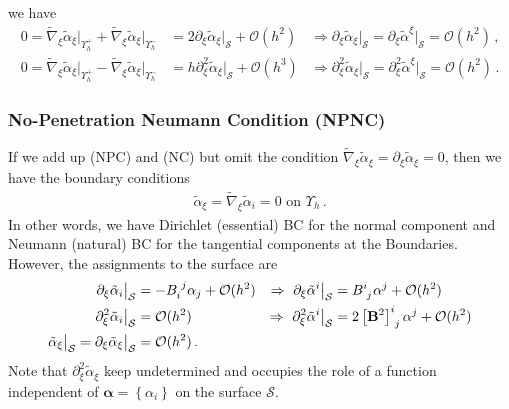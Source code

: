 \documentclass[a4paper,10pt]{scrartcl}
\newcommand{\surf}{\mathcal{S}}
\newcommand{\landau}{\mathcal{O}}
\newcommand{\Bb}{\mathbf{B}}
\newcommand{\alphab}{\bm{\alpha}}
\newcommand{\talpha}{\tilde{\alpha}}
\newcommand{\tnabla}{\tilde{\nabla}}
\newcommand{\boundary}[1]{\Upsilon_{h}^{#1}}
\newcommand{\AtBoundary}[1]{\big|_{\boundary{#1}}}
\newcommand{\AtSurface}{\big|_{\surf}}
\newcommand{\formComma}{\,\text{,}}
\newcommand{\formPeriod}{\,\text{.}}
\begin{document}
    we have
    \begin{align}
      0 = \tnabla_{\xi}\talpha_{\xi}\AtBoundary{+} + \tnabla_{\xi}\talpha_{\xi}\AtBoundary{-}
        &= 2\partial_{\xi}\talpha_{\xi}\AtSurface + \landau(h^{2})
            &\Rightarrow \boxed{\partial_{\xi}\talpha_{\xi}\AtSurface = \partial_{\xi}\talpha^{\xi}\AtSurface = \landau(h^{2})} \formComma\\
      0 = \tnabla_{\xi}\talpha_{\xi}\AtBoundary{+} - \tnabla_{\xi}\talpha_{\xi}\AtBoundary{-}
        &= h\partial_{\xi}^{2}\talpha_{\xi}\AtSurface + \landau(h^{3})
            &\Rightarrow \boxed{\partial_{\xi}^{2}\talpha_{\xi}\AtSurface  = \partial_{\xi}^{2}\talpha^{\xi}\AtSurface = \landau(h^{2})} \formPeriod
    \end{align}

    \subsubsection{No-Penetration Neumann Condition (NPNC)}
      If we add up (NPC) and (NC) but omit the condition \( \tnabla_{\xi}\talpha_{\xi} = \partial_{\xi}\talpha_{\xi} = 0 \), then we have
      the boundary conditions
      \begin{align}
        \talpha_{\xi} = \tnabla_{\xi}\talpha_{i} = 0 \text{ on }\boundary{} \formPeriod
      \tag{NPNC}
      \end{align}
      In other words, we have Dirichlet (essential) BC for the normal component and Neumann (natural) BC for the tangential components at the Boundaries.
      However, the assignments to the surface are
      \begin{align}
        \partial_{\xi}\talpha_{i}\AtSurface &= - \tensor{B}{_{i}^{j}}\alpha_{j} + \landau(h^{2})
                &\Rightarrow\ \partial_{\xi}\talpha^{i}\AtSurface &= \tensor{B}{^{i}_{j}}\alpha^{j} + \landau(h^{2}) \\
        \partial_{\xi}^{2}\talpha_{i}\AtSurface &= \landau(h^{2})
                &\Rightarrow\ \partial_{\xi}^{2}\talpha^{i}\AtSurface &= 2\tensor{\left[\Bb^{2}\right]}{^{i}_{j}}\alpha^{j} + \landau(h^{2}) \\
        \talpha_{\xi}\AtSurface = \partial_{\xi}\talpha_{\xi}\AtSurface &= \landau(h^{2}) \formPeriod
      \end{align}
      Note that \( \partial_{\xi}^{2}\talpha_{\xi} \) keep undetermined and occupies the role of a function independent of \( \alphab =\left\{ \alpha_{i} \right\} \) on the surface \( \surf \).
        
\end{document}
